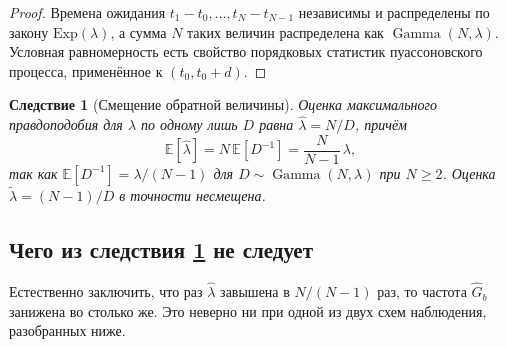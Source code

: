\documentclass[11pt,a4paper]{article}
\theoremstyle{plain}
\newtheorem{corollary}{Следствие}
\theoremstyle{remark}
\DeclareMathOperator{\Gam}{Gamma}
\begin{document}
\begin{proof}
Времена ожидания $t_1-t_0,\dots,t_N-t_{N-1}$ независимы и распределены по закону
$\mathrm{Exp}(\lambda)$, а сумма $N$ таких величин распределена как $\Gam(N,\lambda)$.
Условная равномерность есть свойство порядковых статистик пуассоновского процесса,
применённое к $(t_0,t_0+d)$.
\end{proof}

\begin{corollary}[Смещение обратной величины]\label{cor:kappa}
Оценка максимального правдоподобия для $\lambda$ по одному лишь $D$ равна
$\hat\lambda=N/D$, причём
\begin{equation}\label{eq:bias}
\mathbb E[\hat\lambda]=N\,\mathbb E[D^{-1}]=\frac{N}{N-1}\,\lambda,
\end{equation}
так как $\mathbb E[D^{-1}]=\lambda/(N-1)$ для $D\sim\Gam(N,\lambda)$ при $N\ge2$.
Оценка $\tilde\lambda=(N-1)/D$ в точности несмещена.
\end{corollary}

\subsection{Чего из следствия \ref{cor:kappa} не следует}

Естественно заключить, что раз $\hat\lambda$ завышена в $N/(N-1)$ раз, то частота
$\hat G_b$ занижена во столько же. Это неверно ни при одной из двух схем наблюдения,
разобранных ниже.
\end{document}
